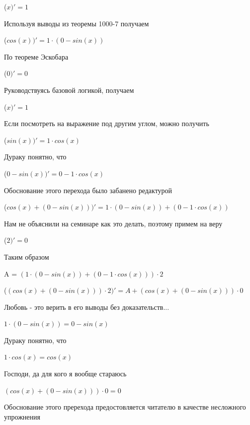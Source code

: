 \documentclass[12pt,a4paper,fleqn]{article}
\begin{document}
\begin{center}
\begin{center}
\begin{center}
\begin{center}
\begin{center}
\begin{center}
\begin{center}
\begin{center}
\begin{center}
\begin{center}
\begin{center}
 ($x)'
  = 1$\end{center}
Используя выводы из теоремы 1000-7 получаем

\begin{center}
 ($cos(x))'
  = 1 \cdot (0-sin(x))$\end{center}
По теореме Эскобара

\begin{center}
 ($0)'
  = 0$\end{center}
Руководствуясь базовой логикой, получаем

\begin{center}
 ($x)'
  = 1$\end{center}
Если посмотреть на выражение под другим углом, можно получить

\begin{center}
 ($sin(x))'
  = 1 \cdot cos(x)$\end{center}
Дураку понятно, что

\begin{center}
 ($0-sin(x))'
  = 0-1 \cdot cos(x)$\end{center}
Обоснование этого перехода было забанено редактурой

\begin{center}
 ($cos(x)+(0-sin(x)))'
  = 1 \cdot (0-sin(x))+(0-1 \cdot cos(x))$\end{center}
Нам не объяснили на семинаре как это делать, поэтому примем на веру

\begin{center}
 ($2)'
  = 0$\end{center}
Таким образом

\begin{center}
A = $(1 \cdot (0-sin(x))+(0-1 \cdot cos(x))) \cdot 2$\end{center}
\begin{center}
 ($(cos(x)+(0-sin(x))) \cdot 2)'
  = A+(cos(x)+(0-sin(x))) \cdot 0$\end{center}
Любовь - это верить в его выводы без доказательств...

\begin{center}
$1 \cdot (0-sin(x)) = 0-sin(x)$\end{center}
Дураку понятно, что

\begin{center}
$1 \cdot cos(x) = cos(x)$\end{center}
Господи, да для кого я вообще стараюсь

\begin{center}
$(cos(x)+(0-sin(x))) \cdot 0 = 0$\end{center}
Обоснование этого пререхода предостовляется читателю в качестве несложного упрожнения


\end{center}
\end{center}
\end{center}
\end{center}
\end{center}
\end{center}
\end{center}
\end{center}
\end{center}
\end{center}
\end{document}
